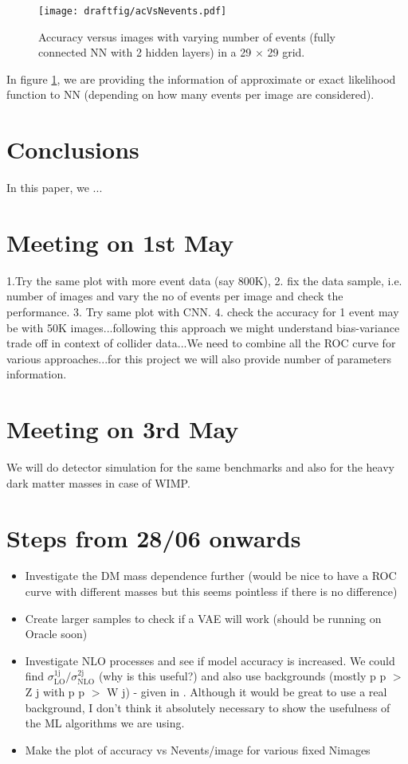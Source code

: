 \documentclass[aps,onecolumn,showpacs,superscriptaddress,groupedaddress,nofootinbib,preprint]{revtex4-1}
\begin{document}
\begin{figure}
\centering
\texttt{[image: draftfig/acVsNevents.pdf]}
\caption{Accuracy versus images with varying number of events (fully connected NN with 2 hidden layers) in a 29 $\times$ 29 grid.}\label{accuracy1}
\end{figure}

In figure \ref{accuracy1}, we are providing the information of approximate or exact likelihood function to NN (depending on how many events per image are considered). 

\section{Conclusions}

In this paper, we ...

\section{Meeting on 1st May}
1.Try the same plot with more event data (say 800K), 2. fix the data sample, i.e. number of images and vary the no of events per image and check the performance.
3. Try same plot with CNN. 4. check the accuracy for 1 event may be with 50K images...following this approach we might understand bias-variance trade off in context 
of collider data...We need to combine all the ROC curve for various approaches...for this project we will also provide number of parameters information.

\section{Meeting on 3rd May}
We will do detector simulation for the same benchmarks and also for the heavy dark matter masses in case of WIMP.


\section{Steps from 28/06 onwards}
\begin{itemize}
	\item Investigate the DM mass dependence further (would be nice to have a ROC curve with different masses but this seems pointless if there is no difference)
	\item Create larger samples to check if a VAE will work (should be running on Oracle soon)
	\item Investigate NLO processes and see if model accuracy is increased. We could find $\sigma_\mathrm{LO}^\mathrm{1j}/\sigma_\mathrm{NLO}^\mathrm{2j}$ (why is this useful?) and also use backgrounds (mostly p p $>$ Z j with p p $>$ W j) - given in \cite{Barducci:2015ffa}. Although it would be great to use a real background, I don't think it absolutely necessary to show the usefulness of the ML algorithms we are using.
	\item Make the plot of accuracy vs Nevents/image for various fixed Nimages
\end{itemize}
\end{document}
